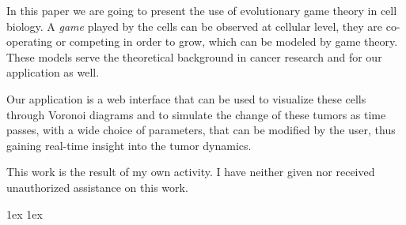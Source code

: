 \documentclass[final]{ubb_dolgozat}
\author{%
Kis Nándor
}
\renewcommand{\baselinestretch}{1.5}
\begin{document}
\begin{abstractEN} %



{
	In this paper we are going to present the use of evolutionary game theory in cell biology. A \textit{game} played by the cells can be observed at cellular level, they are co-operating or competing in order to grow, which can be modeled by game theory. These models serve the theoretical background in cancer research and for our application as well.
	
	Our application is a web interface that can be used to visualize these cells through Voronoi diagrams and to simulate the change of these tumors as time passes, with a wide choice of parameters, that can be modified by the user, thus gaining real-time insight into the tumor dynamics.
}

This work is the result of my own activity. I have neither given nor received unauthorized assistance on this work.

\end{abstractEN}

\maketitle


{ \baselineskip 1ex
  \parskip 1ex
  \tableofcontents
}








{
	\appendix
	
}

{ \renewcommand{\baselinestretch}{0.8}\normalsize %
  \setlength{\itemsep}{-2.4mm}
  \setlength{\bibspacing}{0.67\baselineskip}
  
  
}
\end{document}
